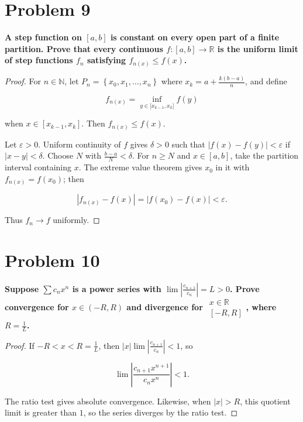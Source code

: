 \section{Problem 9}

\textbf{A step function on \(\left\lbrack {a,b} \right\rbrack\) is constant on every open part of a finite partition. Prove that every continuous \(f:\left\lbrack {a,b} \right\rbrack\rightarrow\mathbb{R}\) is the uniform limit of step functions \(f_{n}\) satisfying \(f_{n{(x)}} \leq f(x)\).}

\begin{proof}

For \(n \in \mathbb{N}\), let \(P_{n} = \left\{ {x_{0},x_{1},\ldots,x_{n}} \right\}\) where \(x_{k} = a + \frac{k\left( {b - a} \right)}{n}\), and define

\[f_{n{(x)}} = \inf\limits_{y \in {\lbrack{x_{k - 1},x_{k}}\rbrack}}f(y)\]

when \(x \in \left\lbrack {x_{k - 1},x_{k}} \right\rbrack\). Then \(f_{n{(x)}} \leq f(x)\).

Let \(\varepsilon > 0\). Uniform continuity of \(f\) gives \(\delta > 0\) such that \(\left| {f(x) - f(y)} \right| < \varepsilon\) if \(\left| {x - y} \right| < \delta\). Choose \(N\) with \(\frac{b - a}{N} < \delta\). For \(n \geq N\) and \(x \in \left\lbrack {a,b} \right\rbrack\), take the partition interval containing \(x\). The extreme value theorem gives \(x_{0}\) in it with \(f_{n{(x)}} = f\left( x_{0} \right)\); then

\[\left| {f_{n{(x)}} - f(x)} \right| = \left| {f\left( x_{0} \right) - f(x)} \right| < \varepsilon.\]

Thus \(f_{n}\rightarrow f\) uniformly.

\end{proof}

\section{Problem 10}

\textbf{Suppose \(\sum c_{n}x^{n}\) is a power series with \(\lim\left| \frac{c_{n + 1}}{c_{n}} \right| = L > 0\). Prove convergence for \(x \in \left( {- R,R} \right)\) and divergence for \(\begin{matrix}
{x \in \mathbb{R}} \\
\left\lbrack {- R,R} \right\rbrack
\end{matrix}\), where \(R = \frac{1}{L}\).}

\begin{proof}

If \(- R < x < R = \frac{1}{L}\), then \(|x|\lim\left| \frac{c_{n + 1}}{c_{n}} \right| < 1\), so

\[\lim\left| \frac{c_{n + 1}x^{n + 1}}{c_{n}x^{n}} \right| < 1.\]

The ratio test gives absolute convergence. Likewise, when \(|x| > R\), this quotient limit is greater than \(1\), so the series diverges by the ratio test.

\end{proof}

